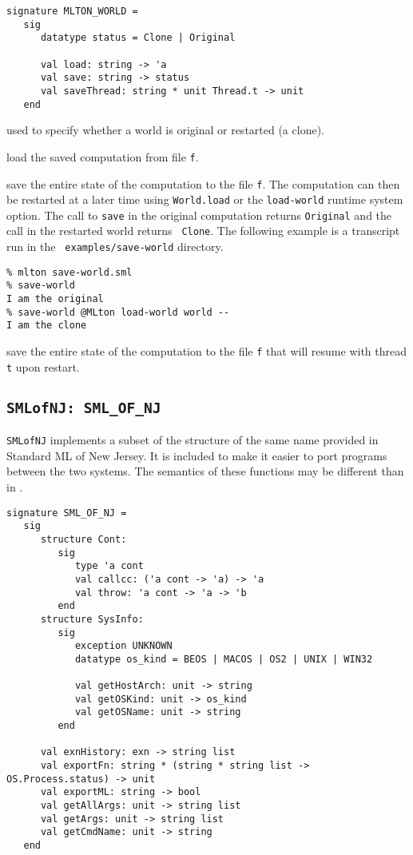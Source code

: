 \begin{verbatim}
signature MLTON_WORLD =
   sig
      datatype status = Clone | Original

      val load: string -> 'a
      val save: string -> status
      val saveThread: string * unit Thread.t -> unit
   end
\end{verbatim}

\begin{description}
used to specify whether a world is original or restarted (a clone).

load the saved computation from file {\tt f}.

save the entire state of the computation to
the file {\tt f}.  The computation can then be restarted at a later
time using {\tt World.load} or the {\tt load-world} runtime system
option.  The call to {\tt save} in the original computation returns
{\tt Original} and the call in the restarted world returns {\tt
Clone}.  The following example is a transcript run in the {\tt
examples/save-world} directory.
\begin{verbatim}
% mlton save-world.sml
% save-world
I am the original
% save-world @MLton load-world world --
I am the clone
\end{verbatim}

save the entire state of the computation to
the file {\tt f} that will resume with thread {\tt t} upon restart.

\end{description}
%
\subsection{{\tt SMLofNJ: SML\_OF\_NJ}}

{\tt SMLofNJ} implements a subset of the structure of the same name
provided in Standard ML of New Jersey.  It is included to make it
easier to port programs between the two systems.  The semantics of
these functions may be different than in {\smlnj}.

\begin{verbatim}
signature SML_OF_NJ =
   sig
      structure Cont:
         sig
            type 'a cont
            val callcc: ('a cont -> 'a) -> 'a
            val throw: 'a cont -> 'a -> 'b
         end
      structure SysInfo:
         sig
            exception UNKNOWN
            datatype os_kind = BEOS | MACOS | OS2 | UNIX | WIN32

            val getHostArch: unit -> string
            val getOSKind: unit -> os_kind
            val getOSName: unit -> string
         end

      val exnHistory: exn -> string list
      val exportFn: string * (string * string list -> OS.Process.status) -> unit
      val exportML: string -> bool
      val getAllArgs: unit -> string list
      val getArgs: unit -> string list
      val getCmdName: unit -> string
   end
\end{verbatim}

